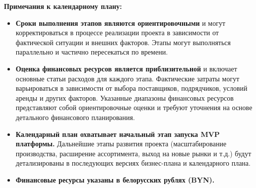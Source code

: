 \vspace{0.3cm}

\textbf{Примечания к календарному плану:}

\begin{itemize}
    \item \textbf{Сроки выполнения этапов являются ориентировочными} и могут корректироваться в процессе реализации проекта в зависимости от фактической ситуации и внешних факторов.  Этапы могут выполняться параллельно и частично пересекаться по времени.
    \item \textbf{Оценка финансовых ресурсов является приблизительной} и включает основные статьи расходов для каждого этапа.  Фактические затраты могут варьироваться в зависимости от выбора поставщиков, подрядчиков, условий аренды и других факторов.  Указанные диапазоны финансовых ресурсов представляют собой ориентировочные оценки и требуют уточнения на основе детального финансового планирования.
    \item \textbf{Календарный план охватывает начальный этап запуска MVP платформы.}  Дальнейшие этапы развития проекта (масштабирование производства, расширение ассортимента, выход на новые рынки и т.д.) будут детализированы в последующих версиях бизнес-плана и календарного плана.
    \item \textbf{Финансовые ресурсы указаны в белорусских рублях (BYN).}
\end{itemize}